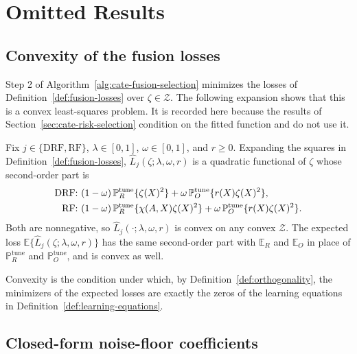 \section{Omitted Results}
\label{app:omitted}

\subsection{Convexity of the fusion losses}
\label{app:fusion-convexity}

Step 2 of Algorithm~\ref{alg:cate-fusion-selection} minimizes the losses of Definition~\ref{def:fusion-losses} over $\zeta\in\mathcal Z$. The following expansion shows that this is a convex least-squares problem. It is recorded here because the results of Section~\ref{sec:cate-risk-selection} condition on the fitted function and do not use it.

\begin{proposition}
\label{prop:fusion-convexity}
Fix $j\in\{\mathrm{DRF},\mathrm{RF}\}$, $\lambda\in[0,1]$, $\omega\in[0,1]$, and $r\geq0$. Expanding the squares in Definition~\ref{def:fusion-losses}, $\widehat L_j(\zeta;\lambda,\omega,r)$ is a quadratic functional of $\zeta$ whose second-order part is
\begin{align}
\text{DRF: }&(1-\omega)\,\mathbb P_R^{\mathrm{tune}}\{\zeta(X)^2\}+\omega\,\mathbb P_O^{\mathrm{tune}}\{r(X)\zeta(X)^2\},
\notag\\
\text{RF: }&(1-\omega)\,\mathbb P_R^{\mathrm{tune}}\{\chi(A,X)\zeta(X)^2\}+\omega\,\mathbb P_O^{\mathrm{tune}}\{r(X)\zeta(X)^2\}.
\label{eq:fusion-curvature}
\end{align}
Both are nonnegative, so $\widehat L_j(\cdot;\lambda,\omega,r)$ is convex on any convex $\mathcal Z$. The expected loss $\mathbb E\{\widehat L_j(\zeta;\lambda,\omega,r)\}$ has the same second-order part with $\mathbb E_R$ and $\mathbb E_O$ in place of $\mathbb P_R^{\mathrm{tune}}$ and $\mathbb P_O^{\mathrm{tune}}$, and is convex as well.
\end{proposition}
Convexity is the condition under which, by Definition~\ref{def:orthogonality}, the minimizers of the expected losses are exactly the zeros of the learning equations in Definition~\ref{def:learning-equations}.

\subsection{Closed-form noise-floor coefficients}
\label{app:noise-floor}


